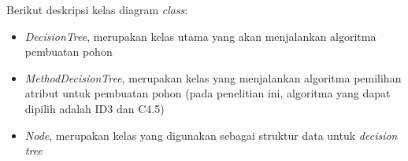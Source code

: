 Berikut deskripsi kelas diagram \textsl{class}:
\begin{itemize}
	\item \textsl{DecisionTree}, merupakan kelas utama yang akan menjalankan algoritma pembuatan pohon
	\item \textsl{MethodDecisionTree}, merupakan kelas yang menjalankan algoritma pemilihan atribut untuk pembuatan pohon (pada penelitian ini, algoritma yang dapat dipilih adalah ID3 dan C4.5)
	\item \textsl{Node}, merupakan kelas yang digunakan sebagai struktur data untuk \textsl{decision tree}
\end{itemize}
	
















